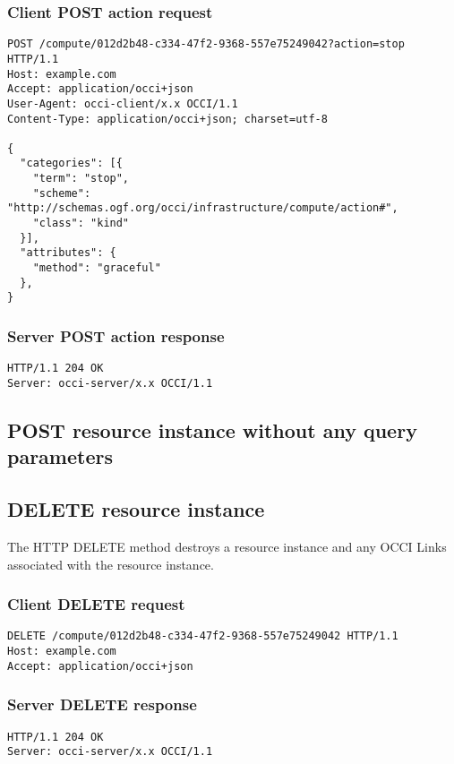 \documentclass[10pt,a4paper]{article}
\begin{document}
\subsubsection{Client POST action request}
\begin{verbatim}
POST /compute/012d2b48-c334-47f2-9368-557e75249042?action=stop HTTP/1.1
Host: example.com
Accept: application/occi+json
User-Agent: occi-client/x.x OCCI/1.1
Content-Type: application/occi+json; charset=utf-8

{
  "categories": [{
    "term": "stop",
    "scheme": "http://schemas.ogf.org/occi/infrastructure/compute/action#",
    "class": "kind"
  }],
  "attributes": {
    "method": "graceful"
  },
}
\end{verbatim}

\subsubsection{Server POST action response}

\begin{verbatim}
HTTP/1.1 204 OK
Server: occi-server/x.x OCCI/1.1
\end{verbatim}

\subsection{POST resource instance without any query parameters}

\subsection{DELETE resource instance}
The HTTP DELETE method destroys a resource instance and any OCCI Links
associated with the resource instance.

\subsubsection{Client DELETE request}
\begin{verbatim}
DELETE /compute/012d2b48-c334-47f2-9368-557e75249042 HTTP/1.1
Host: example.com
Accept: application/occi+json
\end{verbatim}

\subsubsection{Server DELETE response}
\begin{verbatim}
HTTP/1.1 204 OK
Server: occi-server/x.x OCCI/1.1
\end{verbatim}
\end{document}
